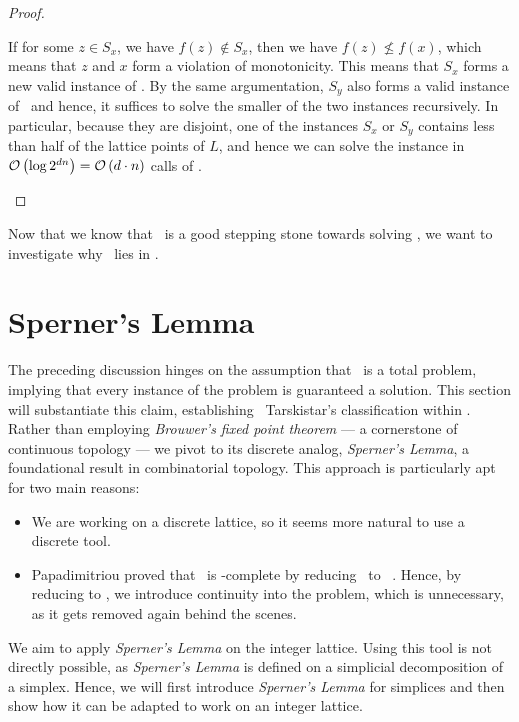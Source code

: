 \begin{proof}
\begin{case}{3}
		If for some $z \in S_x$, we have $f(z) \not\in S_x$, then we have $f(z) \not\leq f(x)$, which means that $z$ and $x$ form a violation of monotonicity. This means that $S_x$ forms a new valid instance of \Tarski. By the same argumentation, $S_y$ also forms a valid instance of \Tarski\, and hence, it suffices to solve the smaller of the two instances recursively. In particular, because they are disjoint, one of the instances $S_x$ or $S_y$ contains less than half of the lattice points of $L$, and hence we can solve the instance in $\mathcal{O}\left(\log{2^{dn}}\right) = \mathcal{O}\left(d \cdot n\right)$ calls of \Tarskistar.
	\end{case}
\end{proof}

Now that we know that \Tarskistar\ is a good stepping stone towards solving \Tarski, we want to investigate why \Tarskistar\ lies in \PPAD.

\section{Sperner's Lemma}

The preceding discussion hinges on the assumption that \Tarskistar\ is a total problem, implying that every instance of the problem is guaranteed a solution. This section will substantiate this claim, establishing \ Tarskistar's classification within \TFNP. Rather than employing \textit{Brouwer's fixed point theorem} --- a cornerstone of continuous topology --- we pivot to its discrete analog, \textit{Sperner's Lemma}, a foundational result in combinatorial topology. This approach is particularly apt for two main reasons:
\begin{itemize}
	\item We are working on a discrete lattice, so it seems more natural to use a discrete tool.
	\item Papadimitriou proved that \Brouwer\ is \PPAD-complete by reducing \Brouwer\ to \Sperner\ . Hence, by reducing to \Brouwer, we introduce continuity into the problem, which is unnecessary, as it gets removed again behind the scenes.
\end{itemize}

We aim to apply \textit{Sperner's Lemma} on the integer lattice. Using this tool is not directly possible, as \textit{Sperner's Lemma} is defined on a simplicial decomposition of a simplex. Hence, we will first introduce \textit{Sperner's Lemma} for simplices and then show how it can be adapted to work on an integer lattice.

